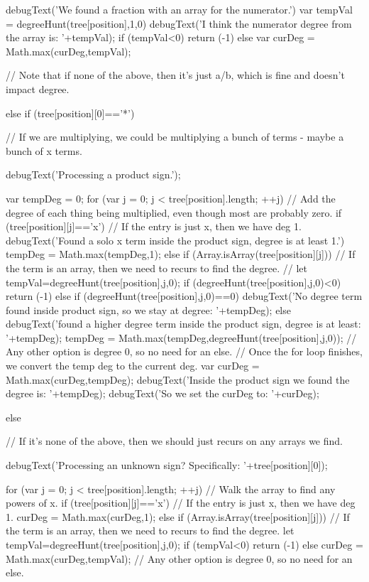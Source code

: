 \begin{javascript}
{{{            debugText('We found a fraction with an array for the numerator.')
            var tempVal = degreeHunt(tree[position],1,0)
            debugText('I think the numerator degree from the array is: '+tempVal);
            if (tempVal<0) { return (-1)} else {
                 var curDeg = Math.max(curDeg,tempVal);
            }
            
        }// Note that if none of the above, then it's just a/b, which is fine and doesn't impact degree.

    } else if (tree[position][0]=='*') {
        // If we are multiplying, we could be multiplying a bunch of terms - maybe a bunch of x terms.
        
        debugText('Processing a product sign.');
        
        var tempDeg = 0;
        for (var j = 0; j < tree[position].length; ++j) {
            // Add the degree of each thing being multiplied, even though most are probably zero.
            if (tree[position][j]=='x') {
                // If the entry is just x, then we have deg 1.
                debugText('Found a solo x term inside the product sign, degree is at least 1.')
                tempDeg = Math.max(tempDeg,1);
            } else if (Array.isArray(tree[position][j])) {
                // If the term is an array, then we need to recurs to find the degree.
                // let tempVal=degreeHunt(tree[position],j,0);
                if (degreeHunt(tree[position],j,0)<0) { 
                    return (-1)
                } else if (degreeHunt(tree[position],j,0)==0){
                    debugText('No degree term found inside product sign, so we stay at degree: '+tempDeg);
                } else {
                    debugText('found a higher degree term inside the product sign, degree is at least: '+tempDeg);
                    tempDeg = Math.max(tempDeg,degreeHunt(tree[position],j,0));
                }
            }// Any other option is degree 0, so no need for an else.
        }
        // Once the for loop finishes, we convert the temp deg to the current deg.
        var curDeg = Math.max(curDeg,tempDeg);
        debugText('Inside the product sign we found the degree is: '+tempDeg);
        debugText('So we set the curDeg to: '+curDeg);
    } else {
        // If it's none of the above, then we should just recurs on any arrays we find.
        
        debugText('Processing an unknown sign? Specifically: '+tree[position][0]);
        
        for (var j = 0; j < tree[position].length; ++j) {
            // Walk the array to find any powers of x.
            if (tree[position][j]=='x') {
                // If the entry is just x, then we have deg 1.
                curDeg = Math.max(curDeg,1);
            } else if (Array.isArray(tree[position][j])) {
                // If the term is an array, then we need to recurs to find the degree.
                let tempVal=degreeHunt(tree[position],j,0);
                if (tempVal<0) { return (-1)} else {
                    curDeg = Math.max(curDeg,tempVal);
                }
            }// Any other option is degree 0, so no need for an else.
        }
        
}}
\end{javascript}
